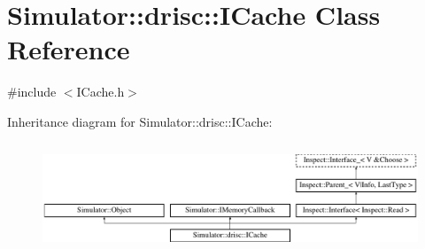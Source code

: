\hypertarget{class_simulator_1_1drisc_1_1_i_cache}{\section{Simulator\+:\+:drisc\+:\+:I\+Cache Class Reference}
\label{class_simulator_1_1drisc_1_1_i_cache}
}


{\ttfamily \#include $<$I\+Cache.\+h$>$}

Inheritance diagram for Simulator\+:\+:drisc\+:\+:I\+Cache\+:\begin{figure}[H]
\begin{center}
\leavevmode
\includegraphics[height=3.289281cm]{class_simulator_1_1drisc_1_1_i_cache}
\end{center}
\end{figure}
